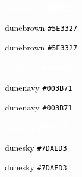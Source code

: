 \noindent
\begin{minipage}[t]{0.3\linewidth}
  \begin{tcolorbox}[colback=dunebrown]
    \textcolor{white}{dunebrown \texttt{\#5E3327}}

    \textcolor{black}{dunebrown \texttt{\#5E3327}}
  \end{tcolorbox}
  \begin{tcolorbox}[colback=white,colframe=dunebrown]
    \textcolor{dunebrown}{dunebrown \texttt{\#5E3327}}
  \end{tcolorbox}
\end{minipage}
\begin{minipage}[t]{0.3\linewidth}
  \begin{tcolorbox}[colback=dunenavy]
    \textcolor{white}{dunenavy \texttt{\#003B71}}

    \textcolor{black}{dunenavy \texttt{\#003B71}}
  \end{tcolorbox}
  \begin{tcolorbox}[colback=white,colframe=dunenavy]
    \textcolor{dunenavy}{dunenavy \texttt{\#003B71}}
  \end{tcolorbox}
\end{minipage}
\begin{minipage}[t]{0.3\linewidth}
  \begin{tcolorbox}[colback=dunesky]
    \textcolor{white}{dunesky \texttt{\#7DAED3}}

    \textcolor{black}{dunesky \texttt{\#7DAED3}}
  \end{tcolorbox}
  \begin{tcolorbox}[colback=white,colframe=dunesky]
    \textcolor{dunesky}{dunesky \texttt{\#7DAED3}}
  \end{tcolorbox}
\end{minipage}

